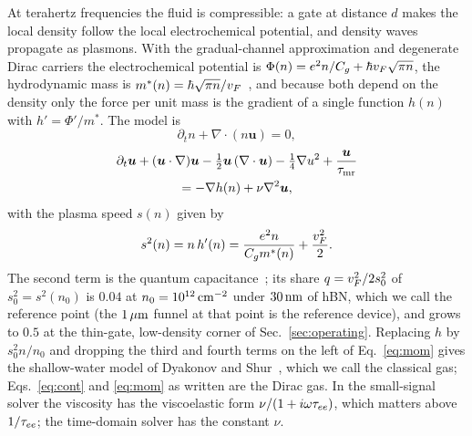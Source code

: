 At terahertz frequencies the fluid is compressible: a gate at distance $d$
makes the local density follow the local electrochemical potential, and
density waves propagate as plasmons. With the gradual-channel approximation
and degenerate Dirac carriers the electrochemical potential is
$\Phi(n)=e^{2}n/C_{g}+\hbar v_{F}\sqrt{\pi n}$, the hydrodynamic mass is
$m^{*}(n)=\hbar\sqrt{\pi n}/v_{F}$~\cite{tomadin2013theory,svintsov2012hydrodynamic}, and because both
depend on the density only the force per unit mass is the gradient of a
single function $h(n)$ with $h'=\Phi'/m^{*}$. The model is
\begin{equation}
\partial_{t}n+\nabla\cdot(n\bm{u})=0,\label{eq:cont}
\end{equation}
\begin{multline}
\partial_{t}\bm{u}+(\bm{u}\cdot\nabla)\bm{u}
-\tfrac12\bm{u}\,(\nabla\cdot\bm{u})-\tfrac14\nabla u^{2}
+\frac{\bm{u}}{\tau_{\mathrm{mr}}}\\
=-\nabla h(n)+\nu\nabla^{2}\bm{u},\label{eq:mom}
\end{multline}
with the plasma speed $s(n)$ given by
\begin{equation}
s^{2}(n)=n\,h'(n)=\frac{e^{2}n}{C_{g}m^{*}(n)}+\frac{v_{F}^{2}}{2}.
\label{eq:s2}
\end{equation}
The second term is the quantum capacitance~\cite{fang2007carrier}; its share $q=v_{F}^{2}/2s_{0}^{2}$
of $s_{0}^{2}=s^{2}(n_{0})$ is $0.04$ at $n_{0}=10^{12}\,\mathrm{cm^{-2}}$ under $30\,\mathrm{nm}$ of
hBN, which we call the reference point (the $1\,\mu\mathrm{m}$ funnel at that point
is the reference device), and grows to $0.5$ at the thin-gate, low-density corner of
Sec.~\ref{sec:operating}. Replacing $h$ by $s_{0}^{2}n/n_{0}$ and dropping
the third and fourth terms on the left of Eq.~\eqref{eq:mom} gives the
shallow-water model of Dyakonov and Shur~\cite{dyakonov1993shallow},
which we call the classical gas; Eqs.~\eqref{eq:cont} and \eqref{eq:mom}
as written are the Dirac gas. In the small-signal solver the viscosity
has the viscoelastic form $\nu/(1+i\omega\tau_{ee})$, which matters above
$1/\tau_{ee}$; the time-domain solver has the constant $\nu$.

